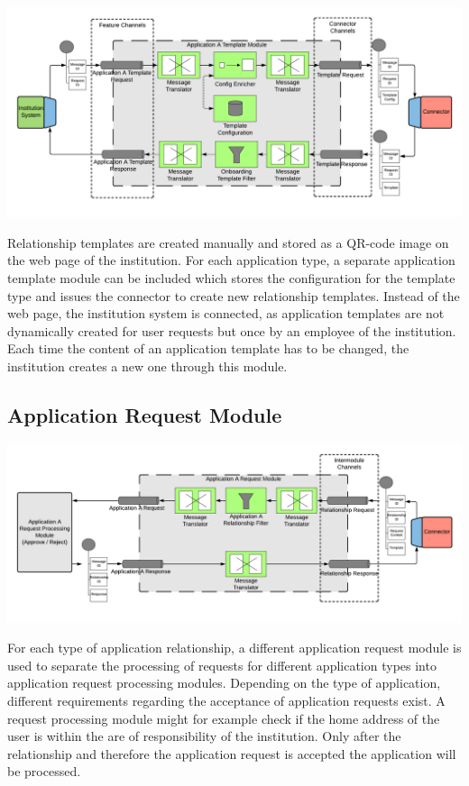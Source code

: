 \begin{center}
    \includegraphics[scale=0.5]{Diagrams/Integration Architecture 2/Technological Integration/4. Application Template Module.pdf}
\end{center}

Relationship templates are created manually and stored as a QR-code image on the web page of the institution. For each application type, a separate application template module can be included which stores the configuration for the template type and issues the connector to create new relationship templates. Instead of the web page, the institution system is connected, as application templates are not dynamically created for user requests but once by an employee of the institution. Each time the content of an application template has to be changed, the institution creates a new one through this module.

\subsection{Application Request Module}

\begin{center}
    \includegraphics[scale=0.5]{Diagrams/Integration Architecture 2/Technological Integration/5. Application Request Module.pdf}
\end{center}

For each type of application relationship, a different application request module is used to separate the processing of requests for different application types into application request processing modules. Depending on the type of application, different requirements regarding the acceptance of application requests exist. A request processing module might for example check if the home address of the user is within the are of responsibility of the institution. Only after the relationship and therefore the application request is accepted the application will be processed.

